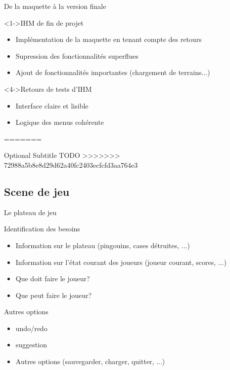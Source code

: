 \documentclass{beamer}
\begin{document}
\begin{frame}{De la maquette à la version finale}
  \begin{block}<1->{IHM de fin de projet}
	\begin{itemize}
	\item <1-> Implémentation de la maquette en tenant compte des retours
	\item <2-> Supression des fonctionnalités superflues
	\item <3-> Ajout de fonctionnalités importantes (chargement de terrains...)
  	\end{itemize}
  \end{block}
  \begin{example}<4->{Retours de tests d'IHM}
    \begin{itemize}
	\item <4-> Interface claire et lisible
	\item <5-> Logique des menus cohérente
	\end{itemize}
  \end{example}
=======
\begin{frame}{}{Optional Subtitle}
TODO
>>>>>>> 72988a5b8e8d29d62a40fc2403ecfcfd3aa764e3
\end{frame}

\subsection{Scene de jeu}

\begin{frame}{Le plateau de jeu}
  \begin{block}{Identification des besoins}
    \begin{itemize}
    \item <1-> Information sur le plateau (pingouins, cases détruites, ...)
    \item <2-> Information sur l'état courant des joueurs (joueur courant, scores, ...)
    \item <3-> Que doit faire le joueur?
    \item <4-> Que peut faire le joueur?
    \end{itemize}
  \end{block}
\end{frame}

\begin{frame}{}
  \begin{block}{Autres options}
    \begin{itemize}
    \item <1-> undo/redo
    \item <2-> suggestion
    \item <3-> Autres options (sauvegarder, charger, quitter, ...)
    \end{itemize}
  \end{block}
\end{frame}


\end{frame}
\end{document}

